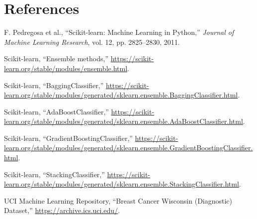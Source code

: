 \documentclass[12pt,a4paper]{article}
\begin{document}
\section{References}
\begin{enumerate}[label={[}\arabic*{]}]
\item F. Pedregosa et al., ``Scikit-learn: Machine Learning in Python,'' \textit{Journal of Machine Learning Research}, vol. 12, pp. 2825--2830, 2011.
\item Scikit-learn, ``Ensemble methods,'' \url{https://scikit-learn.org/stable/modules/ensemble.html}.
\item Scikit-learn, ``BaggingClassifier,'' \url{https://scikit-learn.org/stable/modules/generated/sklearn.ensemble.BaggingClassifier.html}.
\item Scikit-learn, ``AdaBoostClassifier,'' \url{https://scikit-learn.org/stable/modules/generated/sklearn.ensemble.AdaBoostClassifier.html}.
\item Scikit-learn, ``GradientBoostingClassifier,'' \url{https://scikit-learn.org/stable/modules/generated/sklearn.ensemble.GradientBoostingClassifier.html}.
\item Scikit-learn, ``StackingClassifier,'' \url{https://scikit-learn.org/stable/modules/generated/sklearn.ensemble.StackingClassifier.html}.
\item UCI Machine Learning Repository, ``Breast Cancer Wisconsin (Diagnostic) Dataset,'' \url{https://archive.ics.uci.edu/}.
\end{enumerate}
\end{document}
